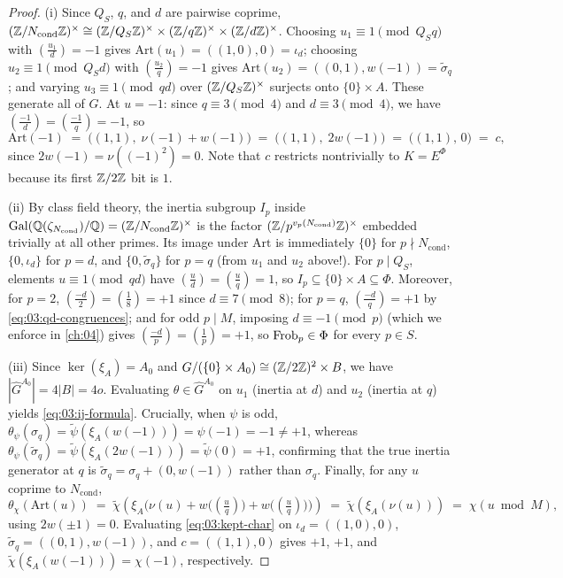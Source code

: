 \begin{proof}
(i) Since $Q_S$, $q$, and $d$ are pairwise coprime, $(\mathbb{Z}/N_{\mathrm{cond}}\mathbb{Z})^\times \cong (\mathbb{Z}/Q_S\mathbb{Z})^\times \times (\mathbb{Z}/q\mathbb{Z})^\times \times (\mathbb{Z}/d\mathbb{Z})^\times$. Choosing $u_1 \equiv 1 \pmod{Q_S q}$ with $(\frac{u_1}{d}) = -1$ gives $\mathrm{Art}(u_1) = ((1,0), 0) = \iota_d$; choosing $u_2 \equiv 1 \pmod{Q_S d}$ with $(\frac{u_2}{q}) = -1$ gives $\mathrm{Art}(u_2) = ((0,1), w(-1)) = \widetilde{\sigma}_q$; and varying $u_3 \equiv 1 \pmod{qd}$ over $(\mathbb{Z}/Q_S\mathbb{Z})^\times$ surjects onto $\{0\} \times A$. These generate all of $G$. At $u = -1$: since $q \equiv 3 \pmod 4$ and $d \equiv 3 \pmod 4$, we have $(\frac{-1}{d}) = (\frac{-1}{q}) = -1$, so
\[
  \mathrm{Art}(-1) \;=\; \bigl((1, 1),\; \nu(-1) + w(-1)\bigr) \;=\; \bigl((1, 1),\; 2w(-1)\bigr) \;=\; \bigl((1, 1),\, 0\bigr) \;=\; c,
\]
since $2w(-1) = \nu((-1)^2) = 0$. Note that $c$ restricts nontrivially to $K = E^\Phi$ because its first $\mathbb{Z}/2\mathbb{Z}$ bit is $1$.

(ii) By class field theory, the inertia subgroup $I_p$ inside $\mathrm{Gal}(\mathbb{Q}(\zeta_{N_{\mathrm{cond}}})/\mathbb{Q}) = (\mathbb{Z}/N_{\mathrm{cond}}\mathbb{Z})^\times$ is the factor $(\mathbb{Z}/p^{v_p(N_{\mathrm{cond}})}\mathbb{Z})^\times$ embedded trivially at all other primes. Its image under $\mathrm{Art}$ is immediately $\{0\}$ for $p \nmid N_{\mathrm{cond}}$, $\{0, \iota_d\}$ for $p = d$, and $\{0, \widetilde{\sigma}_q\}$ for $p = q$ (from $u_1$ and $u_2$ above!). For $p \mid Q_S$, elements $u \equiv 1 \pmod{qd}$ have $(\frac{u}{d}) = (\frac{u}{q}) = 1$, so $I_p \subseteq \{0\} \times A \subseteq \Phi$. Moreover, for $p = 2$, $(\frac{-d}{2}) = (\frac{1}{8}) = +1$ since $d \equiv 7 \pmod 8$; for $p = q$, $(\frac{-d}{q}) = +1$ by \eqref{eq:03:qd-congruences}; and for odd $p \mid M$, imposing $d \equiv -1 \pmod{p}$ (which we enforce in \cref{ch:04}) gives $(\frac{-d}{p}) = (\frac{1}{p}) = +1$, so $\mathrm{Frob}_p \in \Phi$ for every $p \in S$.

(iii) Since $\ker(\xi_A) = A_0$ and $G / (\{0\} \times A_0) \cong (\mathbb{Z}/2\mathbb{Z})^2 \times B$, we have $|\widehat{G}^{A_0}| = 4|B| = 4o$. Evaluating $\theta \in \widehat{G}^{A_0}$ on $u_1$ (inertia at $d$) and $u_2$ (inertia at $q$) yields \eqref{eq:03:ij-formula}. Crucially, when $\psi$ is odd, $\theta_\psi(\sigma_q) = \widetilde{\psi}(\xi_A(w(-1))) = \psi(-1) = -1 \neq +1$, whereas $\theta_\psi(\widetilde{\sigma}_q) = \widetilde{\psi}(\xi_A(2w(-1))) = \widetilde{\psi}(0) = +1$, confirming that the true inertia generator at $q$ is $\widetilde{\sigma}_q = \sigma_q + (0, w(-1))$ rather than $\sigma_q$. Finally, for any $u$ coprime to $N_{\mathrm{cond}}$,
\[
  \theta_\chi(\mathrm{Art}(u)) \;=\; \widetilde{\chi}\!\left(\xi_A\bigl(\nu(u) + w\bigl((\tfrac{u}{q})\bigr) + w\bigl((\tfrac{u}{q})\bigr)\bigr)\right) \;=\; \widetilde{\chi}(\xi_A(\nu(u))) \;=\; \chi(u \bmod M),
\]
using $2w(\pm 1) = 0$. Evaluating \eqref{eq:03:kept-char} on $\iota_d = ((1,0), 0)$, $\widetilde{\sigma}_q = ((0,1), w(-1))$, and $c = ((1,1), 0)$ gives $+1$, $+1$, and $\widetilde{\chi}(\xi_A(w(-1))) = \chi(-1)$, respectively.
\end{proof}

